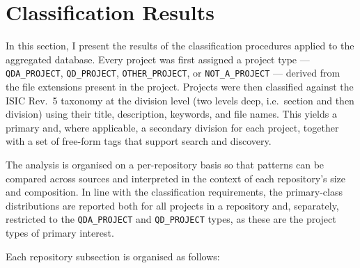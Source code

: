 \section{Classification Results}

In this section, I present the results of the classification procedures applied to the aggregated database. Every project was first assigned a project type --- \texttt{QDA\_PROJECT}, \texttt{QD\_PROJECT}, \texttt{OTHER\_PROJECT}, or \texttt{NOT\_A\_PROJECT} --- derived from the file extensions present in the project. Projects were then classified against the ISIC Rev.~5 taxonomy at the division level (two levels deep, i.e.\ section and then division) using their title, description, keywords, and file names. This yields a primary and, where applicable, a secondary division for each project, together with a set of free-form tags that support search and discovery.

The analysis is organised on a per-repository basis so that patterns can be compared across sources and interpreted in the context of each repository's size and composition. In line with the classification requirements, the primary-class distributions are reported both for all projects in a repository and, separately, restricted to the \texttt{QDA\_PROJECT} and \texttt{QD\_PROJECT} types, as these are the project types of primary interest.

Each repository subsection is organised as follows:

